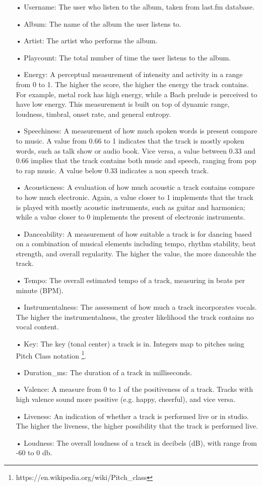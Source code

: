 \begin{itemize}
\item[•] Username: The user who listen to the album, taken from last.fm database.
\item[•] Album: The name of the album the user listens to.
\item[•] Artist: The artist who performs the album.
\item[•] Playcount: The total number of time the user listens to the album.
\item[•] Energy: A perceptual measurement of intensity and activity in a range from 0 to 1. The higher the score, the higher the energy the track contains. For example, metal rock has high energy, while a Bach prelude is perceived to have low energy. This measurement is built on top of dynamic range, loudness, timbral, onset rate, and general entropy.
\item[•] Speechiness: A measurement of how much spoken words is present compare to music. A value from 0.66 to 1 indicates that the track is mostly spoken words, such as talk show or audio book. Vice versa, a value between 0.33 and 0.66 implies that the track contains both music and speech, ranging from pop to rap music. A value below 0.33 indicates a non speech track. 
\item[•] Acousticness: A evaluation of how much acoustic a track contains compare to how much electronic. Again, a value closer to 1 implements that the track is played with mostly acoustic instruments, such as guitar and harmonica; while a value closer to 0 implements the present of electronic instruments.
\item[•] Danceability: A measurement of how suitable a track is for dancing based on a combination of musical elements including tempo, rhythm stability,  beat strength, and overall regularity. The higher the value, the more danceable the track.
\item[•] Tempo: The overall estimated tempo of a track, measuring in beats per minute (BPM).
\item[•] Instrumentalness: The assessment of how much a track incorporates vocals. The higher the instrumentalness, the greater likelihood the track contains no vocal content. 
\item[•] Key: The key (tonal center) a track is in. Integers map to pitches using Pitch Class notation \footnote{https://en.wikipedia.org/wiki/Pitch\_class}. 
\item[•] Duration\_ms: The duration of a track in milliseconds.
\item[•] Valence: A measure from 0 to 1 of the positiveness of a track. Tracks with high valence sound more positive (e.g. happy, cheerful), and vice versa.
\item[•] Liveness: An indication of whether a track is performed live or in studio. The higher the liveness, the higher possibility that the track is performed live.
\item[•] Loudness: The overall loudness of a track in decibels (dB), with range from -60 to 0 db. 
\end{itemize}

